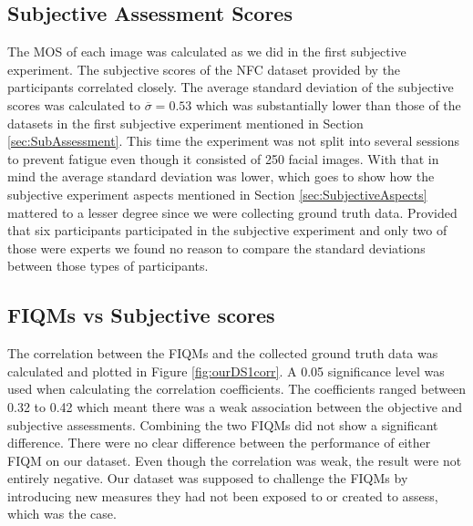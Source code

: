 \subsection{Subjective Assessment Scores}
The MOS of each image was calculated as we did in the first subjective experiment. The subjective scores of the NFC dataset provided by the participants correlated closely. The average standard deviation of the subjective scores was calculated to $\overline{\sigma} = 0.53$ which was substantially lower than those of the datasets in the first subjective experiment mentioned in Section \ref{sec:SubAssessment}. This time the experiment was not split into several sessions to prevent fatigue even though it consisted of 250 facial images. With that in mind the average standard deviation was lower, which goes to show how the subjective experiment aspects mentioned in Section \ref{sec:SubjectiveAspects} mattered to a lesser degree since we were collecting ground truth data. Provided that six participants participated in the subjective experiment and only two of those were experts we found no reason to compare the standard deviations between those types of participants.   

\subsection{FIQMs vs Subjective scores}
The correlation between the FIQMs and the collected ground truth data was calculated and plotted in Figure \ref{fig:ourDS1corr}. A 0.05 significance level was used when calculating the correlation coefficients. The coefficients ranged between 0.32 to 0.42 which meant there was a weak association between the objective and subjective assessments. Combining the two FIQMs did not show a significant difference. There were no clear difference between the performance of either FIQM on our dataset. Even though the correlation was weak, the result were not entirely negative. Our dataset was supposed to challenge the FIQMs by introducing new measures they had not been exposed to or created to assess, which was the case. 

